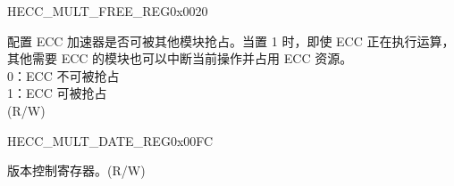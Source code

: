 \begin{register}{H}{ECC\_MULT\_FREE\_REG}{0x0020}\label{regdesc:ECCMULTFREEREG}
%
%
\regnewline%
\begin{regdesc}\begin{reglist}
\label{fielddesc:ECCMULTFREE}\item [ECC\_MULT\_FREE] 配置 ECC 加速器是否可被其他模块抢占。当置 1 时，即使 ECC 正在执行运算，其他需要 ECC 的模块也可以中断当前操作并占用 ECC 资源。\\
0：ECC 不可被抢占\\
1：ECC 可被抢占\\
(R/W)
\end{reglist}\end{regdesc}
\end{register}

\begin{register}{H}{ECC\_MULT\_DATE\_REG}{0x00FC}\label{regdesc:ECCMULTDATEREG}
%
%
\regnewline%
\begin{regdesc}\begin{reglist}
\label{fielddesc:ECCMULTDATE}\item [ECC\_MULT\_DATE] 版本控制寄存器。(R/W)
\end{reglist}\end{regdesc}
\end{register}
